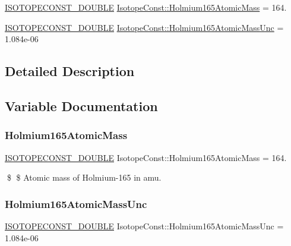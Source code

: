 \begin{DoxyCompactItemize}
\item 
\mbox{\hyperlink{group___isotope_const-_macros_ga8f45a7272ce02c0b4c65c44636ed719a}{I\+S\+O\+T\+O\+P\+E\+C\+O\+N\+S\+T\+\_\+\+D\+O\+U\+B\+LE}} \mbox{\hyperlink{group___isotope_const-_holmium-_ho165_gae8274ffc99915017ba0c375edd2de0ca}{Isotope\+Const\+::\+Holmium165\+Atomic\+Mass}} = 164.
\item 
\mbox{\hyperlink{group___isotope_const-_macros_ga8f45a7272ce02c0b4c65c44636ed719a}{I\+S\+O\+T\+O\+P\+E\+C\+O\+N\+S\+T\+\_\+\+D\+O\+U\+B\+LE}} \mbox{\hyperlink{group___isotope_const-_holmium-_ho165_ga3dbbb0ec14340e92e1d0e92150542a77}{Isotope\+Const\+::\+Holmium165\+Atomic\+Mass\+Unc}} = 1.\+084e-\/06
\end{DoxyCompactItemize}


\subsection{Detailed Description}


\subsection{Variable Documentation}
\mbox{\label{group___isotope_const-_holmium-_ho165_gae8274ffc99915017ba0c375edd2de0ca}} 
\subsubsection{\texorpdfstring{Holmium165\+Atomic\+Mass}{Holmium165AtomicMass}}
{\footnotesize\ttfamily \mbox{\hyperlink{group___isotope_const-_macros_ga8f45a7272ce02c0b4c65c44636ed719a}{I\+S\+O\+T\+O\+P\+E\+C\+O\+N\+S\+T\+\_\+\+D\+O\+U\+B\+LE}} Isotope\+Const\+::\+Holmium165\+Atomic\+Mass = 164.}

\$ \$ Atomic mass of Holmium-\/165 in amu. \mbox{\label{group___isotope_const-_holmium-_ho165_ga3dbbb0ec14340e92e1d0e92150542a77}} 
\subsubsection{\texorpdfstring{Holmium165\+Atomic\+Mass\+Unc}{Holmium165AtomicMassUnc}}
{\footnotesize\ttfamily \mbox{\hyperlink{group___isotope_const-_macros_ga8f45a7272ce02c0b4c65c44636ed719a}{I\+S\+O\+T\+O\+P\+E\+C\+O\+N\+S\+T\+\_\+\+D\+O\+U\+B\+LE}} Isotope\+Const\+::\+Holmium165\+Atomic\+Mass\+Unc = 1.\+084e-\/06}

